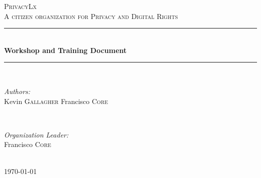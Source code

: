 \documentclass[12pt]{article} %
\begin{document}

\begin{titlepage}

\newcommand{\HRule}{\rule{\linewidth}{0.5mm}} %

\center %

\textsc{\LARGE PrivacyLx}\\[1.5cm] %
\textsc{\large A citizen organization for Privacy and Digital Rights}\\[0.5cm] %

\HRule \\[0.4cm]
{ \huge \bfseries Workshop and Training Document}\\[0.4cm] %
\HRule \\[1.5cm]

\begin{minipage}{0.4\textwidth}
\begin{flushleft} \large
\emph{Authors:}\\
    Kevin \textsc{Gallagher} %
    Francisco \textsc{Core}\\
\end{flushleft}
\end{minipage}
~
\begin{minipage}{0.4\textwidth}
\begin{flushright} \large
\emph{Organization Leader:} \\
Francisco \textsc{Core} %
\end{flushright}
\end{minipage}\\[4cm]

{\large \today}\\[3cm] %


\vfill %

\end{titlepage}
\end{document}
